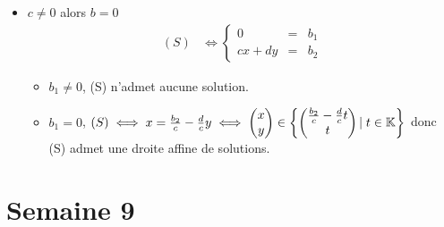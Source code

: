 \documentclass{article}
\renewenvironment{question_kholle}[2][ ]
{
	\subsection{\texorpdfstring{#2}{}}
	\notblank{#1}
	{
		\noindent #1
		\bigbreak
	}
	{}
	\begin{proof}
}
{
	\end{proof}
}
\begin{document}
\begin{question_kholle}
\begin{itemize}[label=$\bullet$ Supposons]
\begin{itemize}[label=$\bullet$ Si]
\begin{itemize}[label=$\bullet$ Si]
\begin{itemize}[label=$\bullet$ Si]
					\end{itemize}
				\end{itemize}
				\item $c \neq 0$ alors $b = 0$
				\begin{equation*}
					\begin{aligned}
						(S)
						&\iff \left\{ \begin{array}{ccc}
							0 &=& b_1 \\
							cx + dy &=& b_2
						\end{array} \right.
					\end{aligned}
				\end{equation*}
				\begin{itemize}[label=$\bullet$ Si]
					\item $b_1 \neq 0$, (S) n'admet aucune solution.
					\item $b_1 = 0$, $(S) \iff x = \frac{b_2}{c} - \frac{d}{c}y \iff \begin{pmatrix} x \\ y \end{pmatrix} \in \begin{Bmatrix} \begin{pmatrix} \frac{b_2}{c} - \frac{d}{c}t \\ t \end{pmatrix} |\; t \in \mathbb K \end{Bmatrix}$ donc (S) admet une droite affine de solutions.
				\end{itemize}
			\end{itemize}
		\end{itemize}

	\end{question_kholle}

\pagebreak\section{Semaine 9}
	
\end{document}
